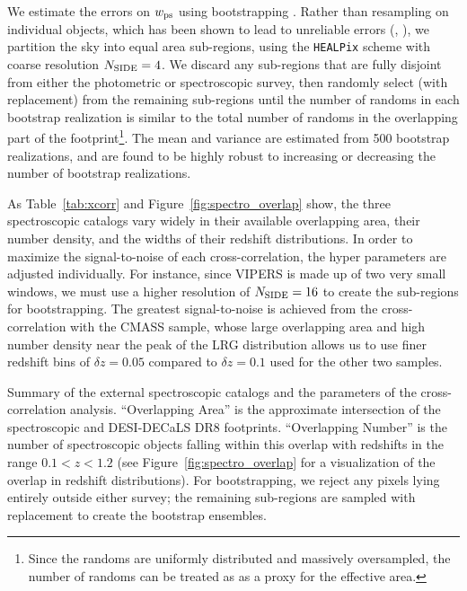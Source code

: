\documentclass[a4paper,usenatbib]{mnras}
\begin{document}
We estimate the errors on $w_{\rm ps}$ using bootstrapping \citep{Efron79}. Rather than resampling on individual objects, which has been shown to lead to unreliable errors (\citealt{Mo92}, \citealt{Fisher94}), we partition the sky into equal area sub-regions, using the \texttt{HEALPix} scheme with coarse resolution $N_{\rm SIDE} = 4$. We discard any sub-regions that are fully disjoint from either the photometric or spectroscopic survey, then randomly select (with replacement) from the remaining sub-regions until the number of randoms in each bootstrap realization is similar to the total number of randoms in the overlapping part of the footprint\footnote{Since the randoms are uniformly distributed and massively oversampled, the number of randoms can be treated as as a proxy for the effective area.}. The mean and variance are estimated from 500 bootstrap realizations, and are found to be highly robust to increasing or decreasing the number of bootstrap realizations.

As Table~\ref{tab:xcorr} and Figure~\ref{fig:spectro_overlap} show, the three spectroscopic catalogs vary widely in  their available overlapping area, their number density, and the widths of their redshift distributions. In order to maximize the signal-to-noise of each cross-correlation, the hyper parameters are adjusted individually. For instance, since VIPERS is made up of two very small windows, we must use a higher resolution of $N_{\rm SIDE} = 16$ to create the sub-regions for bootstrapping. The greatest signal-to-noise is achieved from the cross-correlation with the CMASS sample, whose large overlapping area and high number density near the peak of the LRG distribution allows us to use finer redshift bins of $\delta z = 0.05$ compared to $\delta z = 0.1$ used for the other two samples. 

\begin{table}
    
    \caption{Summary of the external spectroscopic catalogs and the parameters of the cross-correlation analysis. ``Overlapping Area'' is the approximate intersection of the spectroscopic and DESI-DECaLS DR8 footprints. ``Overlapping Number'' is the number of spectroscopic objects falling within this overlap with redshifts in the range $0.1 < z < 1.2$ (see Figure~\ref{fig:spectro_overlap} for a visualization of the overlap in redshift distributions). For bootstrapping, we reject any pixels lying entirely outside either survey; the remaining sub-regions are sampled with replacement to create the bootstrap ensembles.}
    \label{tab:xcorr}
\end{table}
\end{document}
